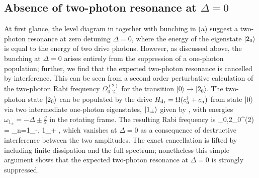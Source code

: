 \subsection{Absence of two-photon resonance at $\Delta = 0$}

At first glance,
the level diagram in  together with
bunching 
in (a) 
suggest a two-photon resonance
at zero detuning $\Delta = 0$,
where the energy of the
eigenstate $| 2_0 \rangle$ is equal to the energy of two drive photons.
However, 
as discussed above,
the bunching at $\Delta = 0$ arises 
entirely from
the suppression of a one-photon population;
further, we 
find that the expected two-photon resonance is 
cancelled by  interference.
This can be seen from a second order perturbative 
calculation of the two-photon Rabi frequency $\Omega_{0,2_0}^{(2)}$ for the transition 
$|0\rangle\rightarrow |2_0\rangle$.  
The two-photon state $| 2_0 \rangle$ can be
populated by the drive 
$H_{\rm dr} = \Omega (c_a^\dag + c_a)$ 
from state $| 0 \rangle$ 
via two intermediate one-photon
eigenstates, $| 1_\pm \rangle$ given by ,
with energies $\omega_{1_\pm} = -\Delta \pm \frac{g}{2}$
in the rotating frame.
The resulting Rabi frequency is
\bel
\label{eq:fgr}
	\Omega_{0,2_0}^{(2)} = \sum_{n=1_-, 1_+}
,
\eel
which vanishes at $\Delta=0$ 
as a consequence of destructive interference between the two amplitudes. 
The exact cancellation is lifted
by including finite dissipation and the full spectrum;
nonetheless this simple argument shows that
the expected two-photon resonance at $\Delta = 0$
is strongly 
suppressed.







